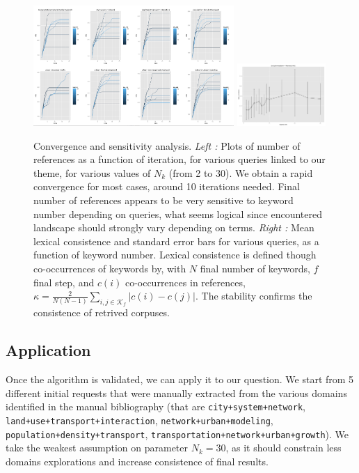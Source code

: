 \begin{figure}
\includegraphics[width=0.68\textwidth]{figures/explo.png}
\includegraphics[width=0.3\textwidth,height=0.3\textheight]{figures/lexicalConsistence_MeanSd}
\caption{Convergence and sensitivity analysis.
\textit{Left : } Plots of number of references as a function of iteration, for various queries linked to our theme, for various values of $N_k$ (from 2 to 30). We obtain a rapid convergence for most cases, around 10 iterations needed. Final number of references appears to be very sensitive to keyword number depending on queries, what seems logical since encountered landscape should strongly vary depending on terms. \textit{Right : } Mean lexical consistence and standard error bars for various queries, as a function of keyword number. Lexical consistence is defined though co-occurrences of keywords by, with $N$ final number of keywords, $f$ final step, and $c(i)$ co-occurrences in references, $\kappa = \frac{2}{N(N-1)}\sum_{i,j \in \mathcal{K}_f}{|c(i)-c(j)|}$. The stability confirms the consistence of retrived corpuses.}
\end{figure}



\subsection{Application}

Once the algorithm is validated, we can apply it to our question. We start from 5 different initial requests that were manually extracted from the various domains identified in the manual bibliography (that are \texttt{city+system+network}, \texttt{land+use+transport+interaction}, \texttt{network+urban+modeling}, \texttt{population+density+transport}, \texttt{transportation+network+urban+growth}). We take the weakest assumption on parameter $N_k=30$, as it should constrain less domains explorations and increase consistence of final results.

